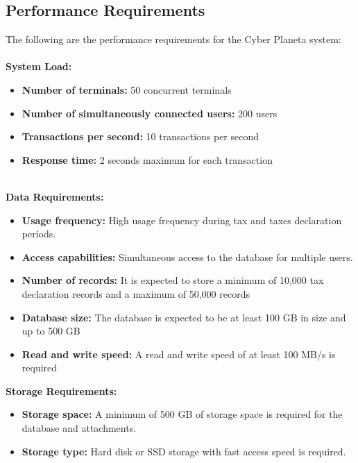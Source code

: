 \documentclass[12pt,a4paper, twosite]{article}
\begin{document}
\subsection{Performance Requirements}
\label{sec:org94bc543}

The following are the performance requirements for the Cyber Planeta system:\\
\\
\textbf{System Load:}

\begin{itemize}
    \item \textbf{Number of terminals:} 50 concurrent terminals
    \item \textbf{Number of simultaneously connected users: }200 users
    \item \textbf{Transactions per second: }10 transactions per second
    \item \textbf{Response time:} 2 seconds maximum for each transaction
\end{itemize}
\\
\textbf{Data Requirements:}
\begin{itemize}
    \item \textbf{Usage frequency:} High usage frequency during tax and taxes declaration periods.
    \item \textbf{Access capabilities:} Simultaneous access to the database for multiple users.
    \item \textbf{Number of records:} It is expected to store a minimum of 10,000 tax declaration records and a maximum of 50,000 records
    \item \textbf{Database size:} The database is expected to be at least 100 GB in size and up to 500 GB
    \item \textbf{Read and write speed:} A read and write speed of at least 100 MB/s is required    
\end{itemize}
\textbf{Storage Requirements:}
\begin{itemize}
    \item \textbf {Storage space:} A minimum of 500 GB of storage space is required for the database and attachments.
    \item \textbf {Storage type:} Hard disk or SSD storage with fast access speed is required.
\end{itemize}
\end{document}
